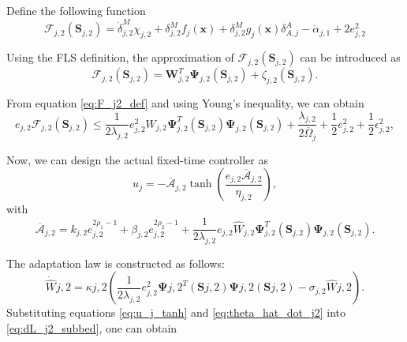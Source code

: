 Define the following function
\begin{equation} \label{eq:F_j2_def}
\mathcal{F}_{j,2}\left(\mathbf{S}_{j,2}\right) = \dot{\delta}_{j,2}^M \chi_{j,2} + \delta_{j,2}^M f_j(\mathbf{x}) + \delta_{j,2}^M g_j(\mathbf{x})\delta_{A,j}^A - \dot{\alpha}_{j,1} + 2e_{j,2}^{2}
\end{equation}

Using the FLS definition, the approximation of $\mathcal{F}_{j,2}(\mathbf{S}_{j,2})$ can be introduced as
\begin{equation} 
\mathcal{F}_{j,2}\left(\mathbf{S}_{j,2}\right) = \mathbf{W}_{j,2}^{T}\mathbf{\Psi}_{j,2}\left(\mathbf{S}_{j,2}\right) + \zeta_{j,2}(\mathbf{S}_{j,2}).
\end{equation}

From equation \eqref{eq:F_j2_def} and using Young's inequality, we can obtain
\begin{equation} \label{eq:Youngs_step2_full}
e_{j,2}\mathcal{F}_{j,2}\left(\mathbf{S}_{j,2}\right) \leq \frac{1}{2\lambda_{j,2}}e_{j,2}^{2}W_{j,2}\mathbf{\Psi}_{j,2}^{T}\left(\mathbf{S}_{j,2}\right)\mathbf{\Psi}_{j,2}\left(\mathbf{S}_{j,2}\right) +\frac{\lambda_{j,2}}{2\overline{\Omega}_{j}} + \frac{1}{2}e_{j,2}^{2} + \frac{1}{2}\epsilon_{j,2}^{2},
\end{equation}

Now, we can design the actual fixed-time controller as
\begin{equation} \label{eq:u_j_tanh}
u_{j} = -\overline{\mathcal{A}}_{j,2}\tanh\left(\frac{e_{j,2}\overline{\mathcal{A}}_{j,2}}{\eta_{j,2}}\right),
\end{equation}
with
\begin{equation} \label{eq:A_bar_j2_def}
\overline{\mathcal{A}}_{j,2} = k_{j,2}e_{j,2}^{2\rho_{1} - 1} + \beta_{j,2}e_{j,2}^{2\rho_{2} - 1} + \frac{1}{2\lambda_{j,2}}e_{j,2}\hat{W}_{j,2}\mathbf{\Psi}_{j,2}^{T}\left(\mathbf{S}_{j,2}\right)\mathbf{\Psi}_{j,2}\left(\mathbf{S}_{j,2}\right).
\end{equation}

The adaptation law is constructed as follows: 
\begin{equation} \label{eq:theta_hat_dot_j2} \dot{\widehat{W}}{j,2} = \kappa{j,2}\left(\frac{1}{2\lambda_{j,2}}e_{j,2}^{2}\mathbf{\Psi}{j,2}^{T}\left(\mathbf{S}{j,2}\right)\mathbf{\Psi}{j,2}\left(\mathbf{S}{j,2}\right) - \sigma_{j,2}\hat{W}{j,2}\right). 
\end{equation}
Substituting equations \eqref{eq:u_j_tanh} and \eqref{eq:theta_hat_dot_j2} into \eqref{eq:dL_j2_subbed}, one can obtain 

